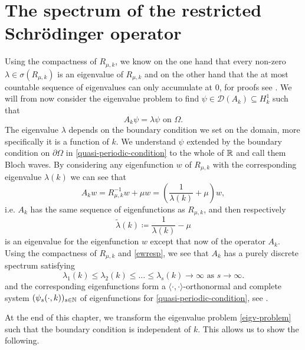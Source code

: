 \section{The spectrum of the restricted Schrödinger operator}
Using the compactness of $R_{\mu, k}$, we know on the one hand that every non-zero $\lambda \in \sigma(R_{\mu, k})$ is an eigenvalue of $R_{\mu, k}$ and on the other hand that the at most countable sequence of eigenvalues can only accumulate at $0$, for proofs see \cite[page 74 - 76]{weis2015funkana}. We will from now consider the eigenvalue problem to find $\psi \in \mathcal{D}(A_{k}) \subseteq H_{k}^{1}$ such that
	\begin{equation}
		A_{k} \psi = \lambda \psi \text{ on } \Omega. \label{eigv-problem}
	\end{equation}
The eigenvalue $\lambda$ depends on the boundary condition we set on the domain, more specifically it is a function of $k$. We understand $\psi$ extended by the boundary condition on $\partial \Omega$ in \eqref{quasi-periodic-condition} to the whole of $\mathbb{R}$ and call them Bloch waves. By considering any eigenfunction $w$ of $R_{\mu, k}$ with the corresponding eigenvalue $\lambda(k)$ we can see that
	\[ A_{k} w = R_{\mu, k}^{-1} w + \mu w = \left(\frac{1}{\lambda(k)} + \mu\right) w, \]
	i.e. $A_{k}$ has the same sequence of eigenfunctions as $R_{\mu, k}$, and then respectively
	\begin{equation}
		\tilde{\lambda}(k) \coloneqq \frac{1}{\lambda(k)} - \mu \label{ewresp}
	\end{equation} 
is an eigenvalue for the eigenfunction $w$ except that now of the operator $A_{k}$. Using the compactness of $R_{\mu, k}$ and \eqref{ewresp}, we see that $A_{k}$ has a purely discrete spectrum satisfying
	\[ \lambda_{1}(k) \leq \lambda_{2}(k) \leq \dotsc \leq \lambda_{s}(k) \rightarrow \infty \text{ as } s \rightarrow \infty. \]
and the corresponding eigenfunctions form a $\langle \cdot , \cdot \rangle$-orthonormal and complete system $(\psi_{s}(\cdot, k))_{s \in \mathbb{N}}$ of eigenfunctions for \eqref{quasi-periodic-condition}, see \cite[page 643 - 645]{evans1998partial}.

At the end of this chapter, we transform the eigenvalue problem \eqref{eigv-problem} such that the boundary condition is independent of $k$. This allows us to show the following.

